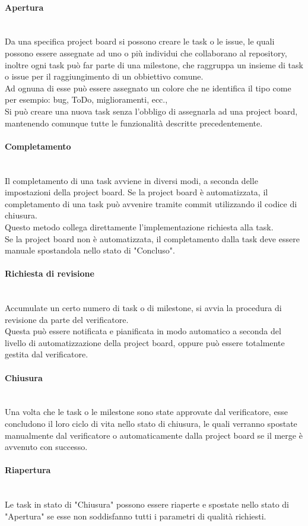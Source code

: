 \paragraph{Apertura} \-\\
	Da una specifica project board si possono creare le task o le issue\glossario, le quali possono essere assegnate ad uno o più individui che collaborano al repository, inoltre ogni task può far parte di una milestone, che raggruppa un insieme di task o issue per il raggiungimento di un obbiettivo comune. \\
	Ad ognuna di esse può essere assegnato un colore che ne identifica il tipo come per esempio: bug, ToDo, miglioramenti, ecc.,\\
	Si può creare una nuova task senza l'obbligo di assegnarla ad una project board, mantenendo comunque tutte le funzionalità descritte precedentemente. 

\paragraph{Completamento} \-\\\label{ProcessiSupporto_GestioneProgetto_CicloTask_Completamento}
	Il completamento di una task avviene in diversi modi, a seconda delle impostazioni della project board. 
	Se la project board è automatizzata, il completamento di una task può avvenire tramite commit utilizzando il codice di chiusura. \\
	Questo metodo collega direttamente l'implementazione richiesta alla task. \\
	Se la project board non è automatizzata, il completamento dalla task deve essere manuale spostandola nello stato di "Concluso". 
	
\paragraph{Richiesta di revisione} \-\\
	Accumulate un certo numero di task o di milestone, si avvia la procedura di revisione da parte del verificatore. \\ Questa può essere notificata e pianificata in modo automatico a seconda del livello di automatizzazione della project board, oppure può essere totalmente gestita dal verificatore. 
	
	
	\paragraph{Chiusura} \-\\
	Una volta che le task o le milestone sono state approvate dal verificatore, esse concludono il loro ciclo di vita nello stato di chiusura, le quali verranno spostate manualmente dal verificatore o automaticamente dalla project board se il merge è avvenuto con successo. 
	
\paragraph{Riapertura} \-\\ \label{ProcessiSupporto_Riapertura}
	Le task in stato di "Chiusura" possono essere riaperte e spostate nello stato di "Apertura" se esse non soddisfanno tutti i parametri di qualità richiesti.
	